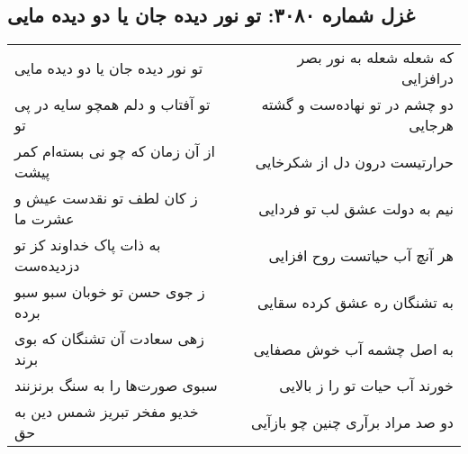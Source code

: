 \begin{center}
\section*{غزل شماره ۳۰۸۰: تو نور دیده جان یا دو دیده مایی}
\label{sec:3080}
\begin{longtable}{l p{0.5cm} r}
تو نور دیده جان یا دو دیده مایی
&&
که شعله شعله به نور بصر درافزایی
\\
تو آفتاب و دلم همچو سایه در پی تو
&&
دو چشم در تو نهاده‌ست و گشته هرجایی
\\
از آن زمان که چو نی بسته‌ام کمر پیشت
&&
حرارتیست درون دل از شکرخایی
\\
ز کان لطف تو نقدست عیش و عشرت ما
&&
نیم به دولت عشق لب تو فردایی
\\
به ذات پاک خداوند کز تو دزدیده‌ست
&&
هر آنچ آب حیاتست روح افزایی
\\
ز جوی حسن تو خوبان سبو سبو برده
&&
به تشنگان ره عشق کرده سقایی
\\
زهی سعادت آن تشنگان که بوی برند
&&
به اصل چشمه آب خوش مصفایی
\\
سبوی صورت‌ها را به سنگ برنزنند
&&
خورند آب حیات تو را ز بالایی
\\
خدیو مفخر تبریز شمس دین به حق
&&
دو صد مراد برآری چنین چو بازآیی
\\
\end{longtable}
\end{center}
